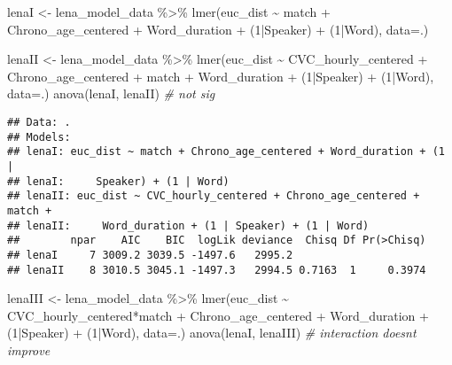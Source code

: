 \documentclass[
]{article}
\newenvironment{Shaded}{\begin{snugshade}}{\end{snugshade}}
\newcommand{\AttributeTok}[1]{\textcolor[rgb]{0.77,0.63,0.00}{#1}}
\newcommand{\CommentTok}[1]{\textcolor[rgb]{0.56,0.35,0.01}{\textit{#1}}}
\newcommand{\DecValTok}[1]{\textcolor[rgb]{0.00,0.00,0.81}{#1}}
\newcommand{\FunctionTok}[1]{\textcolor[rgb]{0.00,0.00,0.00}{#1}}
\newcommand{\NormalTok}[1]{#1}
\newcommand{\OtherTok}[1]{\textcolor[rgb]{0.56,0.35,0.01}{#1}}
\newcommand{\SpecialCharTok}[1]{\textcolor[rgb]{0.00,0.00,0.00}{#1}}
\begin{document}
\begin{Shaded}
\begin{Highlighting}[]
\NormalTok{lenaI }\OtherTok{\textless{}{-}}\NormalTok{ lena\_model\_data }\SpecialCharTok{\%\textgreater{}\%}
  \FunctionTok{lmer}\NormalTok{(euc\_dist }\SpecialCharTok{\textasciitilde{}}\NormalTok{ match }\SpecialCharTok{+} 
\NormalTok{         Chrono\_age\_centered }\SpecialCharTok{+} 
\NormalTok{         Word\_duration }\SpecialCharTok{+} 
\NormalTok{         (}\DecValTok{1}\SpecialCharTok{|}\NormalTok{Speaker) }\SpecialCharTok{+} 
\NormalTok{         (}\DecValTok{1}\SpecialCharTok{|}\NormalTok{Word), }
       \AttributeTok{data=}\NormalTok{.) }

\NormalTok{lenaII }\OtherTok{\textless{}{-}}\NormalTok{ lena\_model\_data }\SpecialCharTok{\%\textgreater{}\%}
  \FunctionTok{lmer}\NormalTok{(euc\_dist }\SpecialCharTok{\textasciitilde{}}\NormalTok{ CVC\_hourly\_centered }\SpecialCharTok{+}
\NormalTok{         Chrono\_age\_centered }\SpecialCharTok{+} 
\NormalTok{         match }\SpecialCharTok{+} 
\NormalTok{         Word\_duration }\SpecialCharTok{+} 
\NormalTok{         (}\DecValTok{1}\SpecialCharTok{|}\NormalTok{Speaker) }\SpecialCharTok{+} 
\NormalTok{         (}\DecValTok{1}\SpecialCharTok{|}\NormalTok{Word), }
       \AttributeTok{data=}\NormalTok{.) }
\FunctionTok{anova}\NormalTok{(lenaI, lenaII) }\CommentTok{\# not sig }
\end{Highlighting}
\end{Shaded}

\begin{verbatim}
## Data: .
## Models:
## lenaI: euc_dist ~ match + Chrono_age_centered + Word_duration + (1 | 
## lenaI:     Speaker) + (1 | Word)
## lenaII: euc_dist ~ CVC_hourly_centered + Chrono_age_centered + match + 
## lenaII:     Word_duration + (1 | Speaker) + (1 | Word)
##        npar    AIC    BIC  logLik deviance  Chisq Df Pr(>Chisq)
## lenaI     7 3009.2 3039.5 -1497.6   2995.2                     
## lenaII    8 3010.5 3045.1 -1497.3   2994.5 0.7163  1     0.3974
\end{verbatim}

\begin{Shaded}
\begin{Highlighting}[]
\NormalTok{lenaIII }\OtherTok{\textless{}{-}}\NormalTok{ lena\_model\_data }\SpecialCharTok{\%\textgreater{}\%}
  \FunctionTok{lmer}\NormalTok{(euc\_dist }\SpecialCharTok{\textasciitilde{}}\NormalTok{ CVC\_hourly\_centered}\SpecialCharTok{*}\NormalTok{match }\SpecialCharTok{+} 
\NormalTok{         Chrono\_age\_centered }\SpecialCharTok{+} 
\NormalTok{         Word\_duration }\SpecialCharTok{+} 
\NormalTok{         (}\DecValTok{1}\SpecialCharTok{|}\NormalTok{Speaker) }\SpecialCharTok{+} 
\NormalTok{         (}\DecValTok{1}\SpecialCharTok{|}\NormalTok{Word), }
       \AttributeTok{data=}\NormalTok{.) }
\FunctionTok{anova}\NormalTok{(lenaI, lenaIII) }\CommentTok{\# interaction doesn\textquotesingle{}t improve}
\end{Highlighting}
\end{Shaded}
\end{document}
